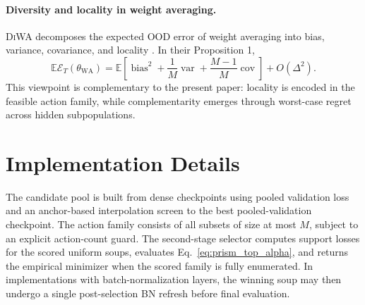 \documentclass{article}
\newcommand{\EE}{\mathbb{E}}
\newcommand{\diwa}{\textup{\textsc{DiWA}}}
\newcommand{\ood}{OOD}
\newcommand{\bracks}[1]{\left[ #1 \right]}
\newcommand{\1}{\mathbbm{1}}
\begin{document}
\paragraph{Diversity and locality in weight averaging.}
\diwa{} decomposes the expected \ood{} error of weight averaging into bias, variance, covariance, and locality \citep{rame2022diwa}. In their Proposition 1,
\begin{equation}
    \EE\mathcal{E}_T(\theta_{\mathrm{WA}})
    =
    \EE\bracks{
        \operatorname{bias}^2
        + \frac{1}{M}\operatorname{var}
        + \frac{M-1}{M}\operatorname{cov}
    }
    + O(\Delta^2).
    \label{eq:diwa_appendix}
\end{equation}
This viewpoint is complementary to the present paper: locality is encoded in the feasible action family, while complementarity emerges through worst-case regret across hidden subpopulations.

\section{Implementation Details}

The candidate pool is built from dense checkpoints using pooled validation loss and an anchor-based interpolation screen to the best pooled-validation checkpoint. The action family consists of all subsets of size at most \(M\), subject to an explicit action-count guard. The second-stage selector computes support losses for the scored uniform soups, evaluates Eq.~\eqref{eq:prism_top_alpha}, and returns the empirical minimizer when the scored family is fully enumerated. In implementations with batch-normalization layers, the winning soup may then undergo a single post-selection BN refresh before final evaluation.
\end{document}
